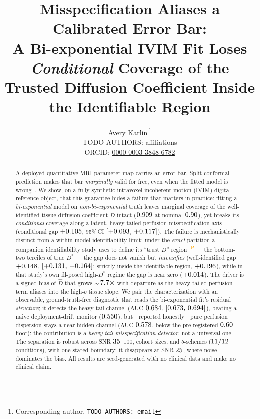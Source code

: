 \documentclass[11pt]{article}
\title{\textbf{Misspecification Aliases a Calibrated Error Bar:\\
A Bi-exponential IVIM Fit Loses \emph{Conditional} Coverage of the\\
Trusted Diffusion Coefficient Inside the Identifiable Region}}
\author{%
Avery Karlin\,\thanks{Corresponding author. \texttt{TODO-AUTHORS: email}}\\[3pt]
\small TODO-AUTHORS: affiliations\\[1pt]
\small ORCID: \href{https://orcid.org/0000-0003-3848-6782}{0000-0003-3848-6782}}
\date{}
\newcommand{\Dstar}{D^{*}}
\newcommand{\PROV}{\textsuperscript{\textcolor{orange}{\,P}}}
\begin{document}
\maketitle

\begin{abstract}
\noindent
A deployed quantitative-MRI parameter map carries an error bar. Split-conformal
prediction makes that bar \emph{marginally} valid for free, even when the fitted
model is wrong~\citep{lei2018,vovk2005}. We show, on a fully synthetic
intravoxel-incoherent-motion (IVIM) digital reference object, that this guarantee
hides a failure that matters in practice: fitting a \emph{bi-exponential} model on
\emph{non-bi-exponential} truth leaves marginal coverage of the well-identified
tissue-diffusion coefficient $D$ intact ($0.909$ at nominal $0.90$), yet
breaks its \emph{conditional} coverage along a latent, heavy-tailed
perfusion-misspecification axis (conditional gap $+0.105$, 95\%\,CI
$[+0.093,\,+0.117]$). The failure is mechanistically distinct from a
within-model identifiability limit: under the \emph{exact} partition a companion
identifiability study uses to define its ``trust $D$'' region~\citep{gauge}\PROV{}
--- the bottom-two terciles of true $\Dstar$ --- the gap does not vanish but
\emph{intensifies} (well-identified gap $+0.148$, $[+0.131,\,+0.164]$;
strictly inside the identifiable region, $+0.196$), while in that study's own
ill-posed high-$\Dstar$ regime the gap is near zero ($+0.014$). The driver is
a signed bias of $\hat{D}$ that grows $\sim$\,$7.7\times$ with departure as
the heavy-tailed perfusion term aliases into the high-$b$ tissue slope. We pair the
characterization with an observable, ground-truth-free diagnostic that reads the
bi-exponential fit's residual \emph{structure}; it detects the heavy-tail channel
(AUC $0.684$, $[0.673,\,0.694]$), beating a naive deployment-drift monitor
($0.550$), but---reported honestly---pure perfusion dispersion stays a
near-hidden channel (AUC $0.578$, below the pre-registered $0.60$
floor): the contribution is a \emph{heavy-tail misspecification detector}, not a
universal one. The separation is robust across SNR $35$--100, cohort sizes,
and $b$-schemes ($11/12$ conditions), with one stated boundary:
it disappears at SNR $25$, where noise dominates the bias. All results are
seed-generated with no clinical data and make no clinical claim.
\end{abstract}
\end{document}
